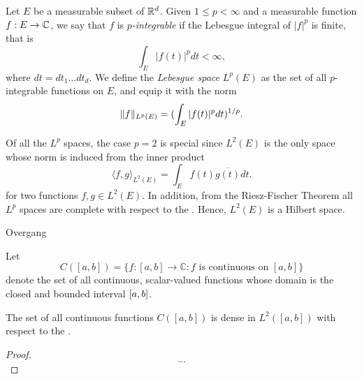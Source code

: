 \documentclass[../thesis.tex]{subfiles}
\begin{document}
\begin{definition}
    Let $E$ be a measurable subset of $\mathbb{R}^d$. Given $1 \leq p < \infty$ and a measurable function $f:E\rightarrow \mathbb{C}$, we say that $f$ is \emph{$p$-integrable} if the Lebesgue integral of $|f|^p$ is finite, that is
    \begin{equation*}
        \int_{E} |f(t)|^p dt < \infty,
    \end{equation*}
    where $dt= dt_1 \dots dt_d$. We define the \emph{Lebesgue space} $L^p(E)$ as the set of all $p$-integrable functions on $E$, and equip it with the norm
    \begin{equation*}
        \|f\|_{L^p(E)} = (\int_{E} |f(t)|^p dt)^{1/p}. \qedhere
    \end{equation*}
\end{definition}

Of all the $L^p$ spaces, the case $p=2$ is special since $L^2(E)$ is the only space whose norm is induced from the inner product
\begin{equation}
    \langle f, g\rangle_{L^2(E)} = \int_{E} f(t)\overline{g(t)} dt.
\end{equation}
for two functions $f,g\in L^2(E)$. In addition, from the Riesz-Fischer Theorem \cite[p.~279]{heilIntroductionRealAnalysis2019} all $L^p$ spaces are complete with respect to the \LPnorm. Hence, $L^2(E)$ is a Hilbert space. 


\colorbox{BurntOrange}{Overgang}

Let
\begin{equation}
    C([a,b]) = \{f:[a,b] \rightarrow \mathbb{C}: f \text{ is continuous on } [a,b]\}
\end{equation}
denote the set of all continuous, scalar-valued functions whose domain is the closed and bounded interval $[a,b]$.

\begin{lemma}\label{lem:c_dense_L2}
    The set of all continuous functions $C([a,b])$ is dense in $L^2([a,b])$ with respect to the \Ltwonorm \space \cite[p.~326]{rudinPrinciplesMathematicalAnalysis20}.
\end{lemma}

\begin{proof}
    $$\dots$$
\end{proof}
\end{document}
